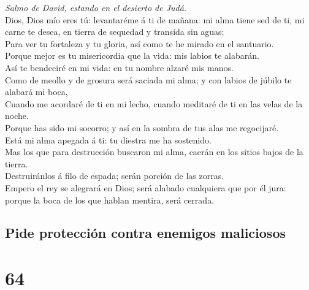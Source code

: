  \emph{Salmo de David, estando en el desierto de Judá.}\\
Dios, Dios mío eres tú: levantaréme á ti de mañana: mi alma tiene sed de
ti, mi carne te desea, en tierra de sequedad y transida sin aguas;\\
 Para ver tu fortaleza y tu gloria, así como te he mirado en
el santuario.\\
 Porque mejor es tu misericordia que la vida: mis labios te
alabarán.\\
 Así te bendeciré en mi vida: en tu nombre alzaré mis
manos.\\
 Como de meollo y de grosura será saciada mi alma; y con
labios de júbilo te alabará mi boca,\\
 Cuando me acordaré de ti en mi lecho, cuando meditaré de ti
en las velas de la noche.\\
 Porque has sido mi socorro; y así en la sombra de tus alas
me regocijaré.\\
 Está mi alma apegada á ti: tu diestra me ha sostenido.\\
 Mas los que para destrucción buscaron mi alma, caerán en
los sitios bajos de la tierra.\\
 Destruiránlos á filo de espada; serán porción de las
zorras.\\
 Empero el rey se alegrará en Dios; será alabado cualquiera
que por él jura: porque la boca de los que hablan mentira, será cerrada.

\hypertarget{pide-protecciuxf3n-contra-enemigos-maliciosos}{%
\subsection{Pide protección contra enemigos
maliciosos}\label{pide-protecciuxf3n-contra-enemigos-maliciosos}}

\hypertarget{section-63}{%
\section{64}\label{section-63}}

